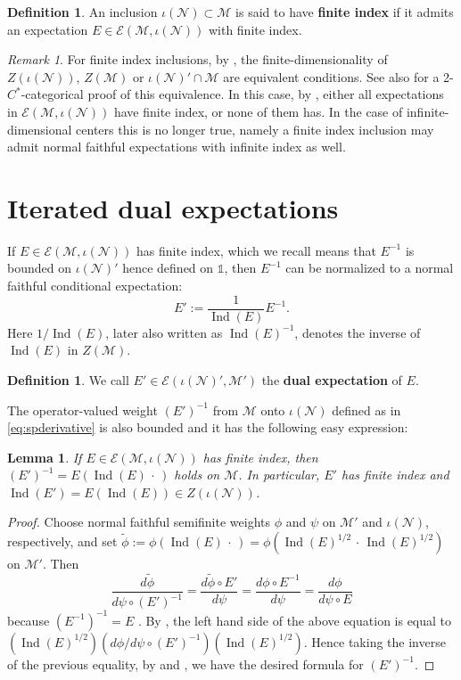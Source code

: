 \documentclass[11pt,a4paper]{article}
\makeatletter
\newcommand{\oneop}{\mathds{1}}
\newcommand{\slot}{{\,\cdot \,}}
\newcommand{\E}{\mathcal{E}}
\newcommand{\M}{\mathcal{M}}
\newcommand{\N}{\mathcal{N}}
\DeclareMathOperator{\Ind}{Ind}
\DeclareRobustCommand{\Prop}{Prop.\@\xspace}
\DeclareRobustCommand{\Cor}{Cor.\@\xspace}
\DeclareRobustCommand{\Thm}{Thm.\@\xspace}
\newcommand{\Cstar}{$C^\ast$\@\xspace}
\theoremstyle{plain}
\newtheorem{lem}[thm]{Lemma}
\theoremstyle{definition}
\newtheorem{defi}[thm]{Definition}
\theoremstyle{remark}
\newtheorem{rmk}[thm]{Remark}
\numberwithin{equation}{section}%
\makeatother
\begin{document}
\begin{defi}\label{def:finindex}
An inclusion $\iota(\N)\subset\M$ is said to have \textbf{finite index} if it admits an expectation $E\in \E(\M,\iota(\N))$ with finite index.  
\end{defi}

\begin{rmk}
For finite index inclusions, by \cite[\Cor 3.18, 3.19]{BDH88}, the finite-dimensionality of $Z(\iota(\N))$, $Z(\M)$ or $\iota(\N)'\cap\M$ are equivalent conditions. See also \cite[\Prop 8.16]{GiLo19} for a 2-\Cstar-categorical proof of this equivalence. In this case, by \cite[\Thm 6.6]{Haa79II}, either all expectations in $\E(\M,\iota(\N))$ have finite index, or none of them has. In the case of infinite-dimensional centers this is no longer true, namely a finite index inclusion may admit normal faithful expectations with infinite index as well.
\end{rmk}


\section{Iterated dual expectations}\label{sec:iterateddualexp}


If $E\in\E(\M,\iota(\N))$ has finite index, which we recall means that $E^{-1}$ is bounded on $\iota(\N)'$ hence defined on $\oneop$, then $E^{-1}$ can be normalized to a normal faithful conditional expectation:
$$E' := \frac{1}{\Ind(E)} E^{-1}.$$ 
Here $1/\Ind(E)$, later also written as $\Ind(E)^{-1}$, denotes the inverse of $\Ind(E)$ in $Z(\M)$.

\begin{defi}
We call $E' \in \E(\iota(\N)',\M')$ the \textbf{dual expectation} of $E$. 
\end{defi}

The operator-valued weight $(E')^{-1}$ from $\M$ onto $\iota(\N)$ defined as in \eqref{eq:spderivative} is also bounded and it has the following easy expression:

\begin{lem}\label{lem:Eprimeinverse}
If $E\in \E(\M,\iota(\N))$ has finite index, then $(E')^{-1} = E(\Ind(E)\slot)$ holds on $\M$. In particular, $E'$ has finite index and $\Ind(E') = E(\Ind(E)) \in Z(\iota(\N))$.
\end{lem}

\begin{proof}
Choose normal faithful semifinite weights $\phi$ and $\psi$ on $\M'$ and $\iota(\N)$, respectively, and set $\widetilde\phi := \phi(\Ind(E) \slot) = \phi(\Ind(E)^{1/2} \slot \Ind(E)^{1/2})$ on $\M'$. 
Then
$$\frac{d \widetilde\phi}{d \psi \circ (E')^{-1}} = \frac{d \widetilde\phi \circ E'}{d \psi} = \frac{d \phi \circ E^{-1}}{d \psi} = \frac{d \phi}{d \psi \circ E}$$
because $(E^{-1})^{-1} = E$ \cite{Kos86}. By \cite[\Prop 8]{Con80}, the left hand side of the above equation is equal to $(\Ind(E)^{1/2}) (d \phi/d \psi \circ (E')^{-1}) (\Ind(E)^{1/2})$. Hence taking the inverse of the previous equality, by \cite[\Thm 9]{Con80} and \cite[\Prop 8]{Con80}, we have the desired formula for $(E')^{-1}$. 
\end{proof}
\end{document}
